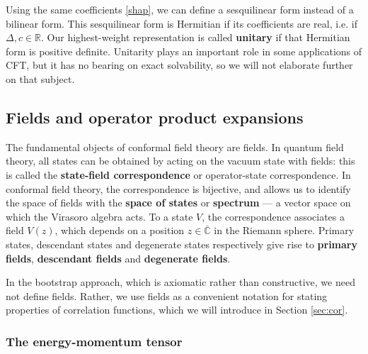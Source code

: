 \documentclass[12pt, a4paper]{article}
\newcommand{\myindex}[1]{\textbf{\boldmath #1}}
\begin{document}
Using the same coefficients \eqref{shap}, we can define a sesquilinear form instead of a bilinear form. This sesquilinear form is Hermitian if its coefficients are real, i.e. if $\Delta,c\in\mathbb{R}$. Our highest-weight representation is called \myindex{unitary} if that Hermitian form is positive definite. Unitarity plays an important role in some applications of CFT, but it has no bearing on exact solvability, so we will not elaborate further on that subject. 


\subsection{Fields and operator product expansions}\label{sec:fope}

The fundamental objects of conformal field theory are fields. In quantum field theory, all states can be obtained by acting on the vacuum state with fields: this is called the \myindex{state-field correspondence} or operator-state correspondence. In conformal field theory, the correspondence is bijective, and allows us to identify the space of fields with the \myindex{space of states}  or \myindex{spectrum}  --- a vector space on which the Virasoro algebra acts. To a state $V$, the correspondence associates a field $V(z)$, which depends on a position $z\in\overline{\mathbb{C}}$ in the Riemann sphere. Primary states, descendant states and degenerate states respectively give rise to \myindex{primary fields}, \myindex{descendant fields} and \myindex{degenerate fields}.

In the bootstrap approach, which is axiomatic rather than constructive, we need not define fields. Rather, we use fields as a convenient notation for stating properties of correlation functions, which we will introduce in Section \ref{sec:cor}. 

\subsubsection{The energy-momentum tensor}
\end{document}
